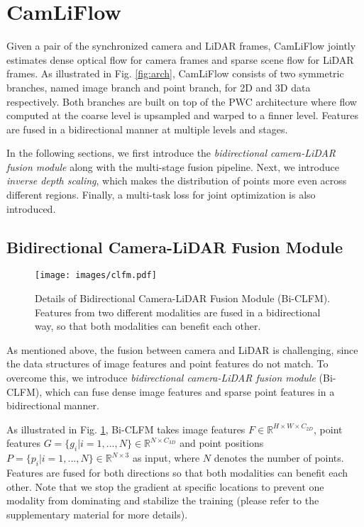 \documentclass[10pt,twocolumn,letterpaper]{article}
\begin{document}
\section{CamLiFlow}

Given a pair of the synchronized camera and LiDAR frames, CamLiFlow jointly estimates dense optical flow for camera frames and sparse scene flow for LiDAR frames. As illustrated in Fig. \ref{fig:arch}, CamLiFlow consists of two symmetric branches, named image branch and point branch, for 2D and 3D data respectively. Both branches are built on top of the PWC architecture \cite{sun2018pwc, wu2019pointpwc} where flow computed at the coarse level is upsampled and warped to a finner level. Features are fused in a bidirectional manner at multiple levels and stages.

In the following sections, we first introduce the \textit{bidirectional camera-LiDAR fusion module} along with the multi-stage fusion pipeline. Next, we introduce \textit{inverse depth scaling}, which makes the distribution of points more even across different regions. Finally, a multi-task loss for joint optimization is also introduced.

\subsection{Bidirectional Camera-LiDAR Fusion Module}

\begin{figure}[t]
    \centering
    \texttt{[image: images/clfm.pdf]}
    \vspace{-18pt}
    \caption{Details of Bidirectional Camera-LiDAR Fusion Module (Bi-CLFM). Features from two different modalities are fused in a bidirectional way, so that both modalities can benefit each other.}
    \vspace{-15pt}
    \label{fig:clfm}
\end{figure}

As mentioned above, the fusion between camera and LiDAR is challenging, since the data structures of image features and point features do not match. To overcome this, we introduce \textit{bidirectional camera-LiDAR fusion module} (Bi-CLFM), which can fuse dense image features and sparse point features in a bidirectional manner. 

As illustrated in Fig. \ref{fig:clfm}, Bi-CLFM takes image features $F \in \mathbb{R}^{H \times W \times C_{2D}}$, point features $G = \{g_i | i = 1, ..., N\} \in \mathbb{R}^{N \times C_{3D}}$ and point positions $P = \{ p_i | i = 1, ..., N \} \in \mathbb{R}^{N \times 3}$ as input, where $N$ denotes the number of points. Features are fused for both directions so that both modalities can benefit each other. Note that we stop the gradient at specific locations to prevent one modality from dominating and stabilize the training (please refer to the supplementary material for more details).
\end{document}
